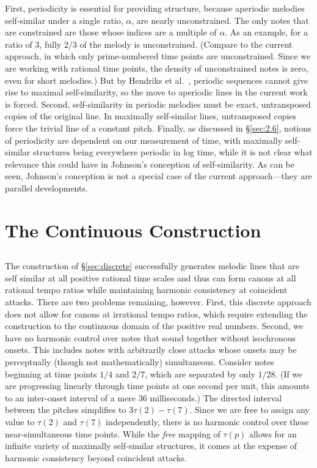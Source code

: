 \documentclass[11pt]{article}
\theoremstyle{plain}
\theoremstyle{definition}
\theoremstyle{remark}
\begin{document}
First, periodicity is essential for providing structure, because aperiodic melodies self-similar under a single ratio, $\alpha$, are nearly unconstrained. The only notes that are constrained are those whose indices are a multiple of $\alpha$. As an example, for a ratio of $3$, fully $2/3$ of the melody is unconstrained. (Compare to the current approach, in which only prime-numbered time points are unconstrained. Since we are working with rational time points, the density of unconstrained notes is zero, even for short melodies.) But by Hendriks et al.\ \cite{hendriks2012}, periodic sequences cannot give rise to maximal self-similarity, so the move to aperiodic lines in the current work is forced. Second, self-similarity in periodic melodies must be exact, untransposed copies of the original line. In maximally self-similar lines, untransposed copies force the trivial line of a constant pitch. Finally, as discussed in \S\ref{sec:2.6}, notions of periodicity are dependent on our measurement of time, with maximally self-similar structures being everywhere periodic in log time, while it is not clear what relevance this could have in Johnson's conception of self-similarity. As can be seen, Johnson's conception is not a
special case of the current approach---they are parallel developments.


\section{The Continuous Construction}
\label{sec:continuous}

\subsection{}
\label{sec:3.1}

The construction of \S\ref{sec:discrete} successfully generates melodic lines that are self similar at all positive rational time scales and thus can form canons at all rational tempo ratios while maintaining
harmonic consistency at coincident attacks. There are two problems remaining, however. First, this discrete approach does not allow for canons at irrational tempo ratios, which require extending the
construction to the continuous domain of the positive real numbers. Second, we have no harmonic control over notes that sound together without isochronous onsets. This includes notes with arbitrarily close attacks whose onsets may be perceptually (though not mathematically) simultaneous. Consider notes beginning at time points $1/4$ and $2/7$, which are separated by only $1/28$. (If we are progressing linearly through time points at one second per unit, this amounts to an inter-onset interval of a mere 36 milliseconds.) The directed interval between the pitches simplifies to $3\tau(2) - \tau(7)$. Since we are free to assign any value to $\tau(2)$ and $\tau(7)$ independently, there is no harmonic control over these near-simultaneous time points. While the \emph{free} mapping of $\tau(p)$ allows for an infinite variety of maximally self-similar structures, it comes at the expense of harmonic consistency beyond coincident attacks.
\end{document}
